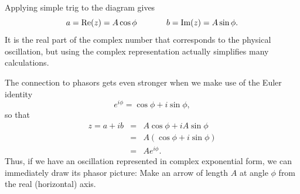 Applying simple trig to the diagram gives 
\begin{equation}
a = \mbox{Re}(z) = A \cos\phi\hspace{0.5in}b = \mbox{Im}(z) = A\sin\phi.
\end{equation} 
It is the real part of the complex number that corresponds to the 
physical oscillation,  but using the complex representation actually 
simplifies many calculations.  

The connection to phasors gets even stronger when we make use of the 
Euler identity
\begin{equation}
e^{i\phi} = \cos\phi + i\sin\phi,
\label{eq:euler}
\end{equation}
so that
\begin{eqnarray}
z = a + ib &=& A\cos\phi + i A\sin\phi \nonumber \\
	   &=& A(\cos\phi + i\sin\phi)  \nonumber \\
  	   &=& Ae^{i\phi}.
\end{eqnarray}
Thus, if we have an oscillation represented in complex exponential form,
we can immediately draw its phasor picture:  Make an arrow of length
$A$ at angle $\phi$ from the real (horizontal) axis.

